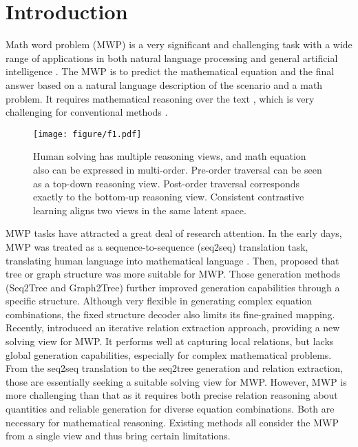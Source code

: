 \documentclass[11pt]{article}
\begin{document}
\section{Introduction}
Math word problem (MWP) is a very significant and challenging task with a wide range of applications in both natural language processing and general artificial intelligence \citep{bobrow1964natural}. The MWP is to predict the mathematical equation and the final answer based on a natural language description of the scenario and a math problem.
It requires mathematical reasoning over the text \citep{mukherjee2008review}, which is very challenging for conventional methods \citep{patel-etal-2021-nlp}.\\
\begin{figure}[t] \centering \texttt{[image: figure/f1.pdf]} \caption{Human solving has multiple reasoning views, and math equation also can be expressed in multi-order. Pre-order traversal can be seen as a top-down reasoning view. Post-order traversal corresponds exactly to the bottom-up reasoning view. Consistent contrastive learning aligns two views in the same latent space.} \label{Fig.f1} \end{figure}
\indent MWP tasks have attracted a great deal of research attention. In the early days, MWP was treated as a sequence-to-sequence (seq2seq) translation task, translating human language into mathematical language \citep{wang2017deep, wang2019template}. Then, \citet{xie2019goal, zhang2020graph,faldu2021towards} proposed that tree or graph structure was more suitable for MWP. Those generation methods (Seq2Tree and Graph2Tree) further improved generation capabilities through a specific structure. Although very flexible in generating complex equation combinations, the fixed structure decoder also limits its fine-grained mapping. Recently, \citet{cao2021bottom, jie2022learning} introduced an iterative relation extraction approach, providing a new solving view for MWP. It performs well at capturing local relations, but lacks global generation capabilities, especially for complex mathematical problems.\\
\indent From the seq2seq translation to the seq2tree generation and relation extraction, those are essentially seeking a suitable solving view for MWP. However, MWP is more challenging than that as it requires both precise relation reasoning about quantities and reliable generation for diverse equation combinations. Both are necessary for mathematical reasoning. Existing methods all consider the MWP from a single view and thus bring certain limitations.\\
\end{document}
